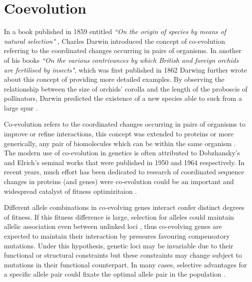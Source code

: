 \section{Coevolution}

In a book published in 1859 entitled \textit{``On the origin of species by means of natural selection"} \cite{darwin1859origin}, Charles Darwin introduced the concept of co-evolution referring to the coordinated changes occurring in pairs of organisms.
In another of his books \textit{``On the various contrivances by which British and foreign orchids are fertilised by insects"}, which was first published in 1862  \cite{darwin1877various} Darwing further wrote about this concept of providing more detailed examples.
By observing the relationship between the size of orchids' corolla and the length of the proboscis of pollinators, Darwin predicted the existence of a new species able to suck from a large spur \cite{de2013emerging}.

Co‐evolution refers to the coordinated changes occurring in pairs of organisms to improve or refine interactions, this concept was extended to proteins  or more generically, any pair of biomolecules which can be within the same organism \cite{de2013emerging}.
The modern use of co-evolution in genetics is often attributed to Dobzhansky's \cite{dobzhansky1950genetics} and Elrich's \cite{ehrlich1964butterflies} seminal works that were published in 1950 and 1964 respectively.
In recent years, much effort has been dedicated to research of coordinated sequence changes in proteins (and genes) were co‐evolution could be an important and widespread catalyst of fitness optimizitaion \cite{de2013emerging}.

Different allele combinations in co-evolving genes interact confer distinct degrees of fitness. 
If this fitness difference is large, selection for alleles could maintain allelic association even between unlinked loci \cite{rohlfs2010detecting}, thus co-evolving genes are expected to maintain their interaction by pressures favouring compensatory mutations. \cite{rohlfs2010detecting}
Under this hypothesis, genetic loci may be invariable due to their functional or structural constraints but these constraints may change subject to mutations in their functional counterpart. \cite{fares2006novel}
In many cases, selective advantages for a specific allele pair could fixate the optimal allele pair in the population \cite{rohlfs2010detecting}.

